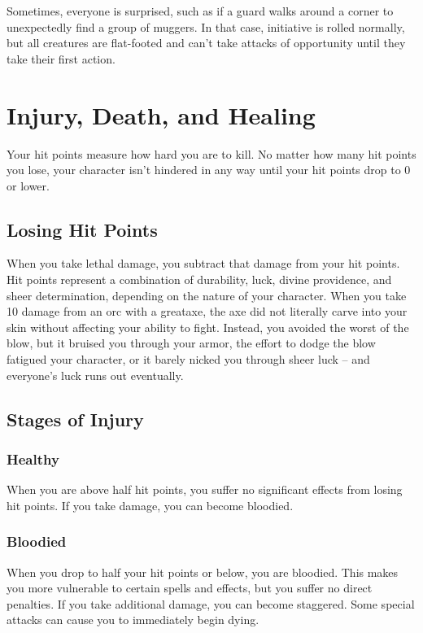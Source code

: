 Sometimes, everyone is surprised, such as if a guard walks around a corner to unexpectedly find a group of muggers. In that case, initiative is rolled normally, but all creatures are flat-footed and can't take attacks of opportunity until they take their first action.

\section{Injury, Death, and Healing}
Your hit points measure how hard you are to kill. No matter how many hit points you lose, your character isn't hindered in any way until your hit points drop to 0 or lower.

\subsection{Losing Hit Points}
When you take lethal damage, you subtract that damage from your hit points.
 Hit points represent a combination of durability, luck, divine providence, and sheer determination, depending on the nature of your character. When you take 10 damage from an orc with a greataxe, the axe did not literally carve into your skin without affecting your ability to fight. Instead, you avoided the worst of the blow, but it bruised you through your armor, the effort to dodge the blow fatigued your character, or it barely nicked you through sheer luck -- and everyone's luck runs out eventually.

\subsection{Stages of Injury}

\subsubsection{Healthy} 
When you are above half hit points, you suffer no significant effects from losing hit points. If you take damage, you can become bloodied.

\subsubsection{Bloodied}
When you drop to half your hit points or below, you are bloodied. This makes you more vulnerable to certain spells and effects, but you suffer no direct penalties. If you take additional damage, you can become staggered. Some special attacks can cause you to immediately begin dying.

